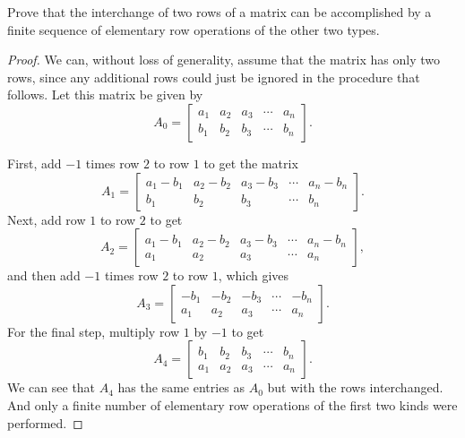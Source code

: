  Prove that the interchange of two rows of a matrix can be
accomplished by a finite sequence of elementary row operations of the
other two types.
\begin{proof}
  We can, without loss of generality, assume that the matrix has only
  two rows, since any additional rows could just be ignored in the
  procedure that follows. Let this matrix be given by
  \begin{equation*}
    A_0 =
    \begin{bmatrix}
      a_1 & a_2 & a_3 & \cdots & a_n \\
      b_1 & b_2 & b_3 & \cdots & b_n
    \end{bmatrix}.
  \end{equation*}

  First, add $-1$ times row $2$ to row $1$ to get the matrix
  \begin{equation*}
    A_1 =
    \begin{bmatrix}
      a_1 - b_1 & a_2 - b_2 & a_3 - b_3 & \cdots & a_n - b_n \\
      b_1 & b_2 & b_3 & \cdots & b_n
    \end{bmatrix}.
  \end{equation*}
  Next, add row $1$ to row $2$ to get
  \begin{equation*}
    A_2 =
    \begin{bmatrix}
      a_1 - b_1 & a_2 - b_2 & a_3 - b_3 & \cdots & a_n - b_n \\
      a_1 & a_2 & a_3 & \cdots & a_n
    \end{bmatrix},
  \end{equation*}
  and then add $-1$ times row $2$ to row $1$, which gives
  \begin{equation*}
    A_3 =
    \begin{bmatrix}
      -b_1 & -b_2 & -b_3 & \cdots & -b_n \\
      a_1 & a_2 & a_3 & \cdots & a_n
    \end{bmatrix}.
  \end{equation*}
  For the final step, multiply row $1$ by $-1$ to get
  \begin{equation*}
    A_4 =
    \begin{bmatrix}
      b_1 & b_2 & b_3 & \cdots & b_n \\
      a_1 & a_2 & a_3 & \cdots & a_n
    \end{bmatrix}.
  \end{equation*}
  We can see that $A_4$ has the same entries as $A_0$ but with the
  rows interchanged. And only a finite number of elementary row
  operations of the first two kinds were performed.
\end{proof}

